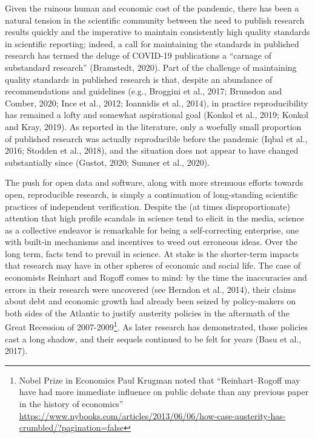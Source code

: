 \documentclass[]{elsarticle} %
\begin{document}
Given the ruinous human and economic cost of the pandemic, there has
been a natural tension in the scientific community between the need to
publish research results quickly and the imperative to maintain
consistently high quality standards in scientific reporting; indeed, a
call for maintaining the standards in published research has termed the
deluge of COVID-19 publications a ``carnage of substandard research''
(Bramstedt, 2020). Part of the challenge of maintaining quality
standards in published research is that, despite an abundance of
recommendations and guidelines (e.g., Broggini et al., 2017; Brunsdon
and Comber, 2020; Ince et al., 2012; Ioannidis et al., 2014), in
practice reproducibility has remained a lofty and somewhat aspirational
goal (Konkol et al., 2019; Konkol and Kray, 2019). As reported in the
literature, only a woefully small proportion of published research was
actually reproducible before the pandemic (Iqbal et al., 2016; Stodden
et al., 2018), and the situation does not appear to have changed
substantially since (Gustot, 2020; Sumner et al., 2020).

The push for open data and software, along with more strenuous efforts
towards open, reproducible research, is simply a continuation of
long-standing scientific practices of independent verification. Despite
the (at times disproportionate) attention that high profile scandals in
science tend to elicit in the media, science as a collective endeavor is
remarkable for being a self-correcting enterprise, one with built-in
mechanisms and incentives to weed out erroneous ideas. Over the long
term, facts tend to prevail in science. At stake is the shorter-term
impacts that research may have in other spheres of economic and social
life. The case of economists Reinhart and Rogoff comes to mind: by the
time the inaccuracies and errors in their research were uncovered (see
Herndon et al., 2014), their claims about debt and economic growth had
already been seized by policy-makers on both sides of the Atlantic to
justify austerity policies in the aftermath of the Great Recession of
2007-2009\footnote{Nobel Prize in Economics Paul Krugman noted that
  ``Reinhart--Rogoff may have had more immediate influence on public
  debate than any previous paper in the history of economics''
  \url{https://www.nybooks.com/articles/2013/06/06/how-case-austerity-has-crumbled/?pagination=false}}.
As later research has demonstrated, those policies cast a long shadow,
and their sequels continued to be felt for years (Basu et al., 2017).
\end{document}
